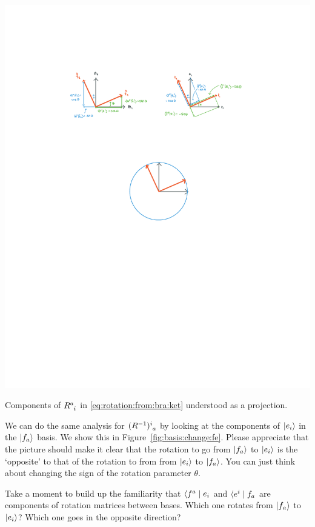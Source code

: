 \documentclass[12pt, oneside]{report}    %
\begin{document}
\begin{marginfigure}%
    \includegraphics[width=\textwidth]{figures/basis_change_fe.pdf}
    \caption{Components of $R\aij{a}{i}$ in \eqref{eq:rotation:from:bra:ket} understood as a projection.}
    \label{fig:basis:change:fe}
\end{marginfigure}

We can do the same analysis for $(R\inv)\aij{i}{a}$ by looking at the components of $\left|e_i\right\rangle$ in the $\left|f_a\right\rangle$ basis. We show this in Figure~\ref{fig:basis:change:fe}. Please appreciate that the picture should make it clear that the rotation to go from $\left|f_a\right\rangle$ to $\left|e_i\right\rangle$ is the `opposite' to that of the rotation to from from $\left|e_i\right\rangle$ to $\left|f_a\right\rangle$. You can just think about changing the sign of the rotation parameter $\theta$. 

\begin{exercise}
Take a moment to build up the familiarity that $\langle f^a \mid e_i$ and $\langle e^i \mid f_a$ are components of rotation matrices between bases. Which one rotates from $\left|f_a\right\rangle$ to $\left|e_i\right\rangle$? Which one goes in the opposite direction? 
\end{exercise}
\end{document}
